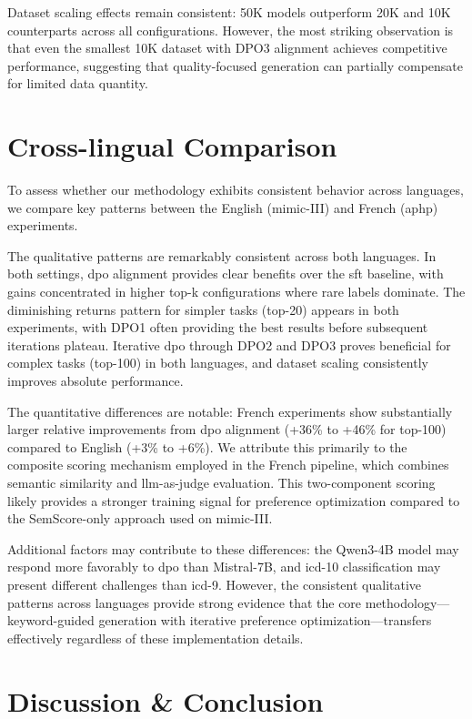 Dataset scaling effects remain consistent: 50K models outperform 20K and 10K counterparts across all configurations.
However, the most striking observation is that even the smallest 10K dataset with DPO3 alignment achieves competitive performance, suggesting that quality-focused generation can partially compensate for limited data quantity.

\section{Cross-lingual Comparison}
\label{sec:crosslingual}

To assess whether our methodology exhibits consistent behavior across languages, we compare key patterns between the English (\gls{mimic}-III) and French (\gls{aphp}) experiments.

The qualitative patterns are remarkably consistent across both languages.
In both settings, \gls{dpo} alignment provides clear benefits over the \gls{sft} baseline, with gains concentrated in higher top-k configurations where rare labels dominate.
The diminishing returns pattern for simpler tasks (top-20) appears in both experiments, with DPO1 often providing the best results before subsequent iterations plateau.
Iterative \gls{dpo} through DPO2 and DPO3 proves beneficial for complex tasks (top-100) in both languages, and dataset scaling consistently improves absolute performance.

The quantitative differences are notable: French experiments show substantially larger relative improvements from \gls{dpo} alignment (+36\% to +46\% for top-100) compared to English (+3\% to +6\%).
We attribute this primarily to the composite scoring mechanism employed in the French pipeline, which combines semantic similarity and \gls{llm}-as-judge evaluation.
This two-component scoring likely provides a stronger training signal for preference optimization compared to the SemScore-only approach used on \gls{mimic}-III.

Additional factors may contribute to these differences: the Qwen3-4B model may respond more favorably to \gls{dpo} than Mistral-7B, and \gls{icd}-10 classification may present different challenges than \gls{icd}-9.
However, the consistent qualitative patterns across languages provide strong evidence that the core methodology---keyword-guided generation with iterative preference optimization---transfers effectively regardless of these implementation details.

\section{Discussion \& Conclusion}

